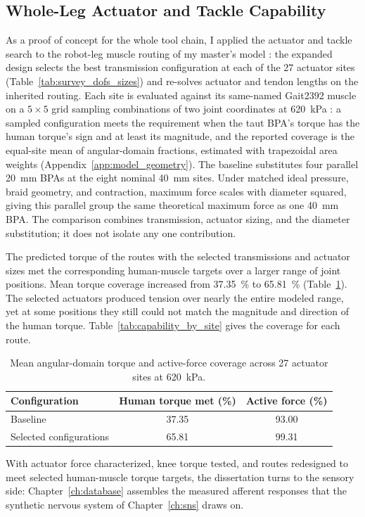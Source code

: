 \subsection{Whole-Leg Actuator and Tackle Capability}

As a proof of concept for the whole tool chain, I applied the actuator and tackle search to the robot-leg muscle routing of my master's model \citep{bolen_determination_2019}: the expanded design selects the best transmission configuration at each of the 27 actuator sites (Table~\ref{tab:survey_dofs_sizes}) and re-solves actuator and tendon lengths on the inherited routing.\label{sec:masters_updated} Each site is evaluated against its same-named Gait2392 muscle \citep{delp_opensim_2007,seth_opensim_2018} on a $5\times5$ grid sampling combinations of two joint coordinates at \qty{620}{\kPa} \citep{bolen_2026}: a sampled configuration meets the requirement when the taut BPA's torque has the human torque's sign and at least its magnitude, and the reported coverage is the equal-site mean of angular-domain fractions, estimated with trapezoidal area weights (Appendix~\ref{app:model_geometry}). The baseline substitutes four parallel \qty{20}{\mm} BPAs at the eight nominal \qty{40}{\mm} sites. Under matched ideal pressure, braid geometry, and contraction, maximum force scales with diameter squared, giving this parallel group the same theoretical maximum force as one \qty{40}{\mm} BPA. The comparison combines transmission, actuator sizing, and the diameter substitution; it does not isolate any one contribution.

The predicted torque of the routes with the selected transmissions and actuator sizes met the corresponding human-muscle targets over a larger range of joint positions. Mean torque coverage increased from \qty{37.35}{\percent} to \qty{65.81}{\percent} (Table~\ref{tab:CapabilitySurvey}). The selected actuators produced tension over nearly the entire modeled range, yet at some positions they still could not match the magnitude and direction of the human torque. Table~\ref{tab:capability_by_site} gives the coverage for each route.

\begin{table}[htbp]
\centering
\caption{Mean angular-domain torque and active-force coverage across 27 actuator sites at \qty{620}{\kPa}.}
\label{tab:CapabilitySurvey}
\begin{tabular}{@{}lcc@{}}
\toprule
\textbf{Configuration} & \textbf{Human torque met (\%)} & \textbf{Active force (\%)} \\
\midrule
Baseline & 37.35 & 93.00 \\
Selected configurations & 65.81 & 99.31 \\
\bottomrule
\end{tabular}
\end{table}

With actuator force characterized, knee torque tested, and routes redesigned to meet selected human-muscle torque targets, the dissertation turns to the sensory side: Chapter~\ref{ch:database} assembles the measured afferent responses that the synthetic nervous system of Chapter~\ref{ch:sns} draws on.
